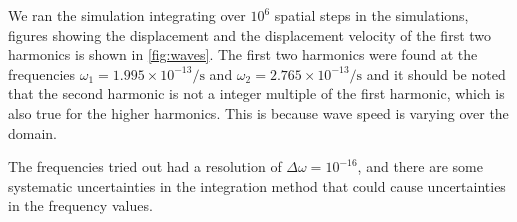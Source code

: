 \documentclass[x11names]{article}
\begin{document}
  We ran the simulation integrating over \(10^6\) spatial steps in the simulations, figures showing the displacement and the displacement velocity of the first two harmonics is shown in \cref{fig:waves}. The first two harmonics were found at the frequencies \( \omega_1 = 1.995 \times 10^{-13} \si{\per \second} \) and \( \omega_2 = 2.765\times 10^{-13} \si{\per \second} \) and it should be noted that the second harmonic is not a integer multiple of the first harmonic, which is also true for the higher harmonics. This is because wave speed is varying over the domain.

  The frequencies tried out had a resolution of \(\Delta\omega = 10^{-16}\), and there are some systematic uncertainties in the integration method that could cause uncertainties in the frequency values.
    
      

\appendix
\end{document}

